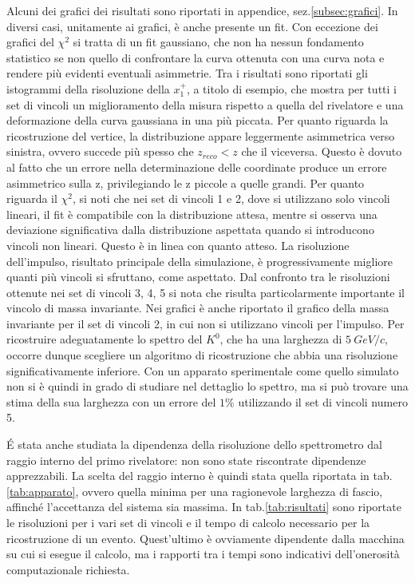 \documentclass[8pt]{extarticle}
\begin{document}
Alcuni dei grafici dei risultati sono riportati in appendice, sez.\ref{subsec:grafici}. In diversi casi, unitamente ai grafici, è anche presente un fit. Con eccezione dei grafici del $\chi^2$ si tratta di un fit gaussiano, che non ha nessun fondamento statistico se non quello di confrontare la curva ottenuta con una curva nota e rendere più evidenti eventuali asimmetrie. Tra i risultati sono riportati gli istogrammi della risoluzione della $x_1^+$, a titolo di esempio, che mostra per tutti i set di vincoli un miglioramento della misura rispetto a quella del rivelatore e una deformazione della curva gaussiana in una più piccata. Per quanto riguarda la ricostruzione del vertice, la distribuzione appare leggermente asimmetrica verso sinistra, ovvero succede più spesso che $z_{reco} < z$ che il viceversa. Questo è dovuto al fatto che un errore nella determinazione delle coordinate produce un errore asimmetrico sulla z, privilegiando le z piccole a quelle grandi. Per quanto riguarda il $\chi^2$, si noti che nei set di vincoli 1 e 2, dove si utilizzano solo vincoli lineari, il fit è compatibile con la distribuzione attesa, mentre si osserva una deviazione significativa dalla distribuzione aspettata quando si introducono vincoli non lineari. Questo è in linea con quanto atteso. La risoluzione dell'impulso, risultato principale della simulazione, è progressivamente migliore quanti più vincoli si sfruttano, come aspettato. Dal confronto tra le risoluzioni ottenute nei set di vincoli 3, 4, 5 si nota che risulta particolarmente importante il vincolo di massa invariante. Nei grafici è anche riportato il grafico della massa invariante per il set di vincoli 2, in cui non si utilizzano vincoli per l'impulso. Per ricostruire adeguatamente lo spettro del $K^0$, che ha una larghezza di $5\ GeV/c$, occorre dunque scegliere un algoritmo di ricostruzione che abbia una risoluzione significativamente inferiore. Con un apparato sperimentale come quello simulato non si è quindi in grado di studiare nel dettaglio lo spettro, ma si può trovare una stima della sua larghezza con un errore del $1\%$ utilizzando il set di vincoli numero 5.

\'E stata anche studiata la dipendenza della risoluzione dello spettrometro dal raggio interno del primo rivelatore: non sono state riscontrate dipendenze apprezzabili. La scelta del raggio interno è quindi stata quella riportata in tab.\ref{tab:apparato}, ovvero quella minima per una ragionevole larghezza di fascio, affinché l'accettanza del sistema sia massima. In tab.\ref{tab:risultati} sono riportate le risoluzioni per i vari set di vincoli e il tempo di calcolo necessario per la ricostruzione di un evento. Quest'ultimo è ovviamente dipendente dalla macchina su cui si esegue il calcolo, ma i rapporti tra i tempi sono indicativi dell'onerosità computazionale richiesta.
\end{document}
